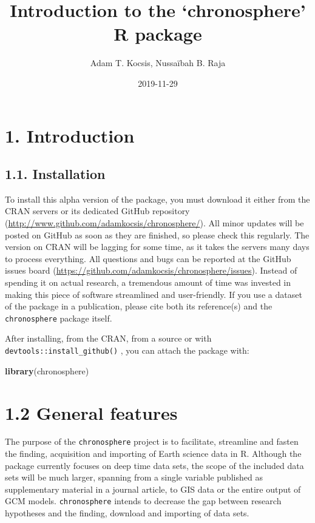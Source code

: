 \documentclass[]{article}
\title{Introduction to the `chronosphere' R package}
\author{Adam T. Kocsis, Nussaïbah B. Raja}
\date{2019-11-29}
\newenvironment{Shaded}{\begin{snugshade}}{\end{snugshade}}
\newcommand{\KeywordTok}[1]{\textcolor[rgb]{0.13,0.29,0.53}{\textbf{#1}}}
\newcommand{\NormalTok}[1]{#1}
\begin{document}
\maketitle

\section{1. Introduction}\label{introduction}

\subsection{1.1. Installation}\label{installation}

To install this alpha version of the package, you must download it
either from the CRAN servers or its dedicated GitHub repository
(\url{http://www.github.com/adamkocsis/chronosphere/}). All minor
updates will be posted on GitHub as soon as they are finished, so please
check this regularly. The version on CRAN will be lagging for some time,
as it takes the servers many days to process everything. All questions
and bugs can be reported at the GitHub issues board
(\url{https://github.com/adamkocsis/chronosphere/issues}). Instead of
spending it on actual research, a tremendous amount of time was invested
in making this piece of software streamlined and user-friendly. If you
use a dataset of the package in a publication, please cite both its
reference(s) and the \texttt{chronosphere} package itself.

After installing, from the CRAN, from a source or with
\texttt{devtools::install\_github()} , you can attach the package with:

\begin{Shaded}
\begin{Highlighting}[]
\KeywordTok{library}\NormalTok{(chronosphere)}
\end{Highlighting}
\end{Shaded}

\section{1.2 General features}\label{general-features}

The purpose of the \texttt{chronosphere} project is to facilitate,
streamline and fasten the finding, acquisition and importing of Earth
science data in R. Although the package currently focuses on deep time
data sets, the scope of the included data sets will be much larger,
spanning from a single variable published as supplementary material in a
journal article, to GIS data or the entire output of GCM models.
\texttt{chronosphere} intends to decrease the gap between research
hypotheses and the finding, download and importing of data sets.
\end{document}

